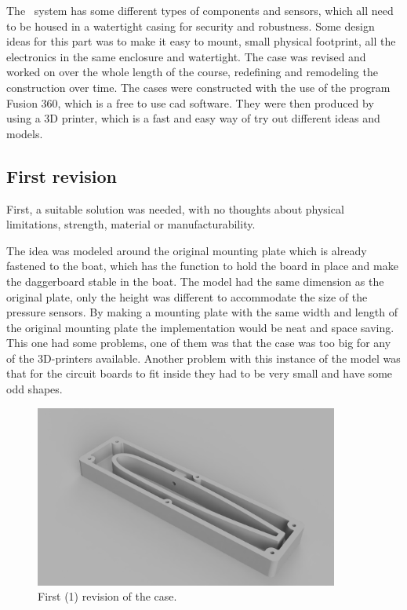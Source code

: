 
The \project~system has some different types of components and sensors, which all need to be housed in a watertight casing for security and robustness. Some design ideas for this part was to make it easy to mount, small physical footprint, all the electronics in the same enclosure and watertight.
The case was revised and worked on over the whole length of the course, redefining and remodeling the construction over time.
The cases were constructed with the use of the program Fusion 360, which is a free to use \gls{cad} software. They were then produced by using a 3D printer, which is a fast and easy way of try out different ideas and models.

\subsection{First revision}
First, a suitable solution was needed, with no thoughts about physical limitations, strength, material or manufacturability.

The idea was modeled around the original mounting plate which is already fastened to the boat, which has the function to hold the board in place and make the daggerboard stable in the boat. The model had the same dimension as the original plate, only the height was different to accommodate the size of the pressure sensors. By making a mounting plate with the same width and length of the original mounting plate the implementation would be neat and space saving.
This one had some problems, one of them was that the case was too big for any of the 3D-printers available. Another problem with this instance of the model was that for the circuit boards to fit inside they had to be very small and have some odd shapes.



\begin{figure}[H]
\begin{center}
	\includegraphics[width = 10cm]{Figures/Case_rev_1.png}
	\caption{First (1) revision of the case.}
	\label{Case_rev_1}
\end{center}
\end{figure}

